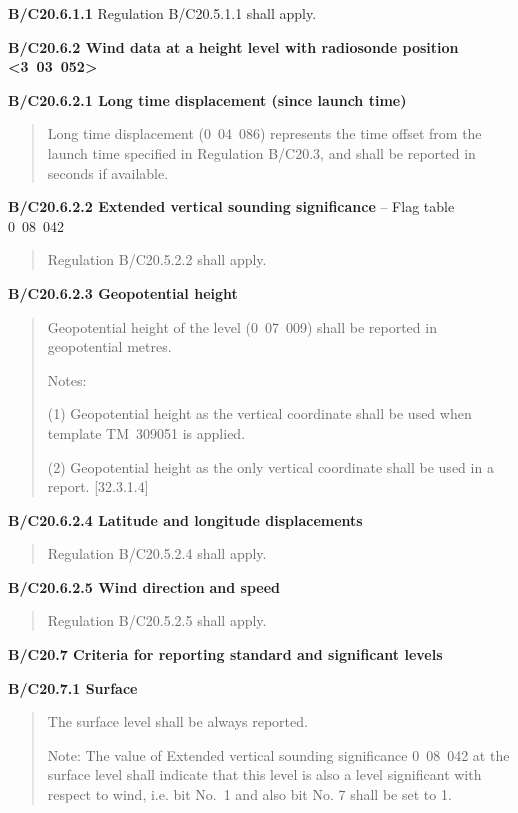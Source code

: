 \textbf{B/C20.6.1.1} Regulation B/C20.5.1.1 shall apply.

\textbf{B/C20.6.2 Wind data at a height level with radiosonde position \textless3~03~052\textgreater{}}

\textbf{B/C20.6.2.1 Long time displacement (since launch time)}

\begin{quote}
Long time displacement (0~04~086) represents the time offset from the launch time specified in Regulation B/C20.3, and shall be reported in seconds if available.
\end{quote}

\textbf{B/C20.6.2.2 Extended vertical sounding significance} -- Flag table 0~08~042

\begin{quote}
Regulation B/C20.5.2.2 shall apply.
\end{quote}

\textbf{B/C20.6.2.3 Geopotential height}

\begin{quote}
Geopotential height of the level (0~07~009) shall be reported in geopotential metres.

Notes:

(1) Geopotential height as the vertical coordinate shall be used when template TM~309051 is applied.

(2) Geopotential height as the only vertical coordinate shall be used in a report. {[}32.3.1.4{]}
\end{quote}

\textbf{B/C20.6.2.4 Latitude and longitude displacements}

\begin{quote}
Regulation B/C20.5.2.4 shall apply.
\end{quote}

\textbf{B/C20.6.2.5 Wind direction} \textbf{and speed}

\begin{quote}
Regulation B/C20.5.2.5 shall apply.
\end{quote}

\textbf{B/C20.7 Criteria for reporting standard and significant levels}

\textbf{B/C20.7.1 Surface}

\begin{quote}
The surface level shall be always reported.

Note: The value of Extended vertical sounding significance 0~08~042 at the surface level shall indicate that this level is also a level significant with respect to wind, i.e. bit No.~1 and also bit No. 7 shall be set to 1.
\end{quote}

